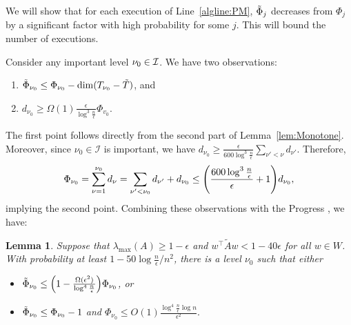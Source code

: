 \documentclass[11pt]{article}
\newtheorem{lemma}[theorem]{Lemma}
\let\originalleft\left
\let\originalright\right
\renewcommand{\left}{\mathopen{}\mathclose\bgroup\originalleft}
\renewcommand{\right}{\aftergroup\egroup\originalright}
\def\dim#1{\mathrm{dim} (#1)}
\newcommand\ww{\boldsymbol{\mathit{w}}}
\renewcommand\AA{\boldsymbol{\mathit{A}}}
\newcommand\WW{\boldsymbol{\mathit{W}}}
\newcommand\AAtil{\boldsymbol{\widetilde{\mathit{A}}}}
\begin{document}
We will show that for each execution of Line~\ref{algline:PM}, $\tilde{\Phi}_{j}$ decreases from $\Phi_j$ by a significant factor with high probability for some $j$. This will bound the number of executions.

Consider any important level $\nu_{0} \in \cal{I}$. We have two observations:
\begin{enumerate}
	\item \label{enu:phi 1} $\Phitil_{\nu_{0}}\leq\Phi_{\nu_{0}}-\dim{T_{\nu_{0}}-\tilde{T}}$, and 
	\item \label{enu:phi 2} $d_{\nu_{0}}\geq\Omega(1)\frac{\epsilon}{\log^{3}\frac{n}{\epsilon}}\Phi_{v_{0}}$. 
\end{enumerate}
The first point follows directly from the second part of Lemma~\ref{lem:Monotone}. Moreover, since $\nu_{0}\in\mathcal{I}$ is important, we have $d_{\nu_{0}}\geq\frac{\epsilon}{600\log^{3}\frac{n}{\epsilon}}\sum_{\nu'<\nu}d_{\nu'}.$ Therefore, 
\[
\Phi_{\nu_{0}}=\sum_{\nu=1}^{\nu_{0}}d_{\nu}=\sum_{\nu'<\nu_{0}}d_{\nu'}+d_{\nu_{0}}\leq\left(\frac{600\log^{3}\frac{n}{\epsilon}}{\epsilon}+1\right)d_{\nu_{0}},
\]
implying the second point. 
Combining these observations with the Progress , we have:
\begin{lemma}
	\label{claim:potential decrease}Suppose that $\lambda_{\max}(\AA)\ge1-\epsilon$ and $\ww^{\top}\AAtil\ww<1-40\epsilon$ for all $\ww\in\WW$. With probability at least $1-50\log\frac{n}{\epsilon}/n^{2}$, there is a level $\nu_{0}$ such that either 
	\begin{itemize}
		\item $\Phitil_{\nu_{0}}\le\left(1-\frac{\Omega(\epsilon^{2})}{\log^{4}\frac{n}{\epsilon}}\right)\Phi_{\nu_{0}}$, or 
		\item $\tilde{\Phi}_{\nu_{0}}\le\Phi_{\nu_{0}}-1$ and $\Phi_{\nu_{0}}\leq O(1)\frac{\log^{4}\frac{n}{\epsilon}\log n}{\epsilon^{2}}.$
	\end{itemize}
\end{lemma}
\end{document}
